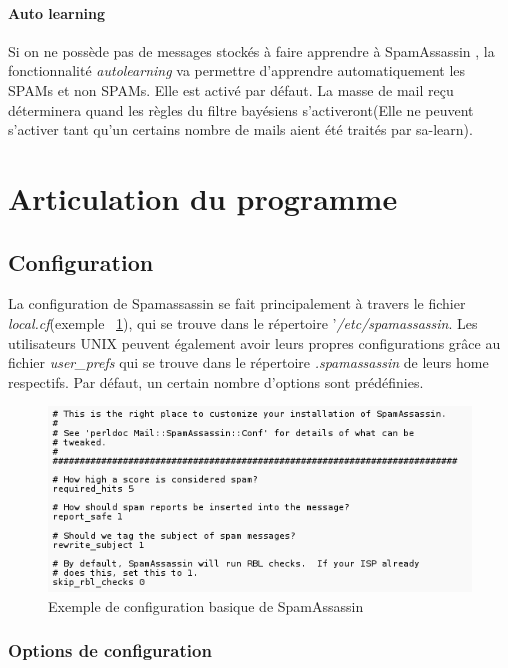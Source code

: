 \documentclass[a4paper,11pt]{article}
\begin{document}
\paragraph*{Auto learning}
Si on ne possède pas de messages stockés à faire apprendre à SpamAssassin , la fonctionnalité \emph{autolearning}
va permettre d'apprendre automatiquement les SPAMs et non SPAMs. Elle est activé par défaut. La masse de mail 
reçu déterminera quand les règles du filtre bayésiens s'activeront(Elle ne peuvent s'activer tant qu'un certains nombre de mails aient été traités par sa-learn).

\section{Articulation du programme}

\subsection{Configuration}

La configuration de Spamassassin se fait principalement à travers le fichier \emph{local.cf}(exemple ~\ref{fig:local_sample}), qui se trouve dans le 
répertoire '\emph{/etc/spamassassin}.
Les utilisateurs UNIX peuvent également avoir leurs propres configurations grâce au fichier \emph{user\_prefs}
qui se trouve dans le répertoire \emph{.spamassassin} de leurs home respectifs. 
Par défaut, un certain nombre d’options sont prédéfinies. 

\begin{figure}[h]
 \centering
 \includegraphics[width=\textwidth]{./annexes/local_sample.png}
 \caption{Exemple de configuration basique de SpamAssassin}
 \label{fig:local_sample}
\end{figure}


\subsubsection{Options de configuration}
\end{document}
